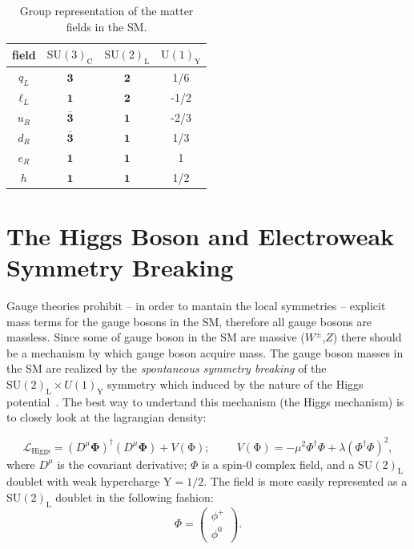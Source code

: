 \begin{table}[htb]
\centering
\large
\begin{tabular}{cccc}
  \hline
  \hline
  field &  $\mathrm{SU(3)_{C}}$ &  $\mathrm{SU(2)_{L}}$ & $\mathrm{U(1)_{Y}}$\\
  \hline                                                        
  $q_{L}$ & $\mathbf{3}$ &  $\mathbf{2}$ & 1/6\\
  $\ell_{L}$ & $\mathbf{1}$ &  $\mathbf{2}$ & -1/2\\
  $u_{R}$ & $\mathbf{\bar{3}}$ &  $\mathbf{1}$ &-2/3\\
  $d_{R}$ & $\mathbf{\bar{3}}$ &  $\mathbf{1}$ &1/3\\
  $e_{R}$ & $\mathbf{1}$ &  $\mathbf{1}$ & 1\\
  $h$ & $\mathbf{1}$ &  $\mathbf{1}$ & 1/2\\
  \hline
  \hline
\end{tabular}
  \caption{\label{tab:SMGroup} Group representation of the matter
    fields in the SM.}
\end{table}
\section{The Higgs Boson and Electroweak Symmetry
  Breaking}\label{higgs}
Gauge theories prohibit -- in order to mantain the local symmetries --  explicit mass terms for the gauge bosons in the SM,
therefore all gauge bosons are massless. Since some of gauge boson in
the SM are massive ($W^{\pm}$,$Z$) there should be a mechanism by
which gauge boson acquire mass. The gauge boson masses in the SM are
realized by the \textit{spontaneous symmetry breaking} of the
$\mathrm{SU(2)_{L}}\times U(1)_{\mathrm{Y}}$ symmetry which induced by the nature of
the Higgs potential~\cite{Englert,HIGGS1,HiGGS2,Guralnik,HIGGS3,Kibble}. The best way to undertand this mechanism (the
Higgs mechanism) is to closely look at the lagrangian density:

\begin{equation}
\label{eq:higgsPotential}
\mathcal{L}_{\mathrm{Higgs}} =
(D^{\mu}\mathbf{\Phi})^{\dagger}(D^{\mu}\mathbf{\Phi}) +
V(\mathrm{\Phi});\hspace{1cm} V(\mathrm{\Phi}) = -\mu^{2}\Phi^{\dagger}\Phi +\lambda(\Phi^{\dagger}\Phi)^{2},
\end{equation}
where $D^{\mu}$ is the covariant derivative; $\Phi$ is a spin-0
complex field, and a $\mathrm{SU(2)_{L}}$ doublet with weak
hypercharge $\mathrm{Y} = 1/2$. The field is more easily represented
as a $\mathrm{SU(2)_{L}}$ doublet in the following fashion:
\begin{equation}
\label{eq:higgdoublet}
\Phi = \begin{pmatrix} \phi^{+}\\
  \phi^{0}\end{pmatrix}.
\end{equation}

